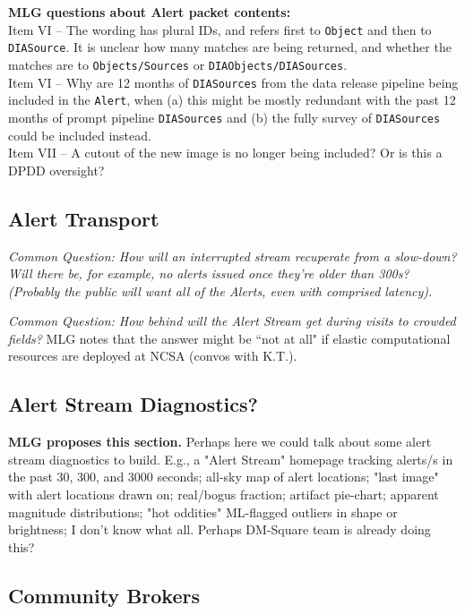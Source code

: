 {\bf MLG questions about Alert packet contents:} \\
Item VI -- The wording has plural IDs, and refers first to {\tt Object} and then to {\tt DIASource}. It is unclear how many matches are being returned, and whether the matches are to {\tt Objects/Sources} or {\tt DIAObjects/DIASources}. \\
Item VI -- Why are 12 months of {\tt DIASources} from the data release pipeline being included in the {\tt Alert}, when (a) this might be mostly redundant with the past 12 months of prompt pipeline {\tt DIASources} and (b) the fully survey of {\tt DIASources} could be included instead. \\
Item VII -- A cutout of the new image is no longer being included? Or is this a DPDD oversight?

\subsection{Alert Transport}

{\it Common Question: How will an interrupted stream recuperate from a slow-down? Will there be, for example, no alerts issued once they're older than 300s? (Probably the public will want all of the Alerts, even with comprised latency).}

{\it Common Question: How behind will the Alert Stream get during visits to crowded fields?} MLG notes that the answer might be ``not at all" if elastic computational resources are deployed at NCSA (convos with K.T.).


\subsection{Alert Stream Diagnostics?}

{\bf MLG proposes this section.} Perhaps here we could talk about some alert stream diagnostics to build. E.g., a "Alert Stream" homepage tracking alerts/s in the past 30, 300, and 3000 seconds; all-sky map of alert locations; "last image" with alert locations drawn on; real/bogus fraction; artifact pie-chart; apparent magnitude distributions; "hot oddities" ML-flagged outliers in shape or brightness; I don't know what all. Perhaps DM-Square team is already doing this?


\subsection{Community Brokers}

